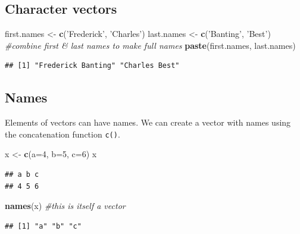 \documentclass[]{article}
\newenvironment{Shaded}{\begin{snugshade}}{\end{snugshade}}
\newcommand{\KeywordTok}[1]{\textcolor[rgb]{0.13,0.29,0.53}{\textbf{#1}}}
\newcommand{\DataTypeTok}[1]{\textcolor[rgb]{0.13,0.29,0.53}{#1}}
\newcommand{\DecValTok}[1]{\textcolor[rgb]{0.00,0.00,0.81}{#1}}
\newcommand{\StringTok}[1]{\textcolor[rgb]{0.31,0.60,0.02}{#1}}
\newcommand{\CommentTok}[1]{\textcolor[rgb]{0.56,0.35,0.01}{\textit{#1}}}
\newcommand{\NormalTok}[1]{#1}
\begin{document}
\subsection{Character vectors}\label{character-vectors}

\begin{Shaded}
\begin{Highlighting}[]
\NormalTok{first.names <-}\StringTok{ }\KeywordTok{c}\NormalTok{(}\StringTok{'Frederick'}\NormalTok{, }\StringTok{'Charles'}\NormalTok{)}
\NormalTok{last.names <-}\StringTok{ }\KeywordTok{c}\NormalTok{(}\StringTok{'Banting'}\NormalTok{, }\StringTok{'Best'}\NormalTok{)}
\CommentTok{#combine first & last names to make full names}
\KeywordTok{paste}\NormalTok{(first.names, last.names)}
\end{Highlighting}
\end{Shaded}

\begin{verbatim}
## [1] "Frederick Banting" "Charles Best"
\end{verbatim}

\subsection{Names}\label{names}

Elements of vectors can have names. We can create a vector with names
using the concatenation function \texttt{c()}.

\begin{Shaded}
\begin{Highlighting}[]
\NormalTok{x <-}\StringTok{ }\KeywordTok{c}\NormalTok{(}\DataTypeTok{a=}\DecValTok{4}\NormalTok{, }\DataTypeTok{b=}\DecValTok{5}\NormalTok{, }\DataTypeTok{c=}\DecValTok{6}\NormalTok{)}
\NormalTok{x}
\end{Highlighting}
\end{Shaded}

\begin{verbatim}
## a b c 
## 4 5 6
\end{verbatim}

\begin{Shaded}
\begin{Highlighting}[]
\KeywordTok{names}\NormalTok{(x) }\CommentTok{#this is itself a vector}
\end{Highlighting}
\end{Shaded}

\begin{verbatim}
## [1] "a" "b" "c"
\end{verbatim}
\end{document}
